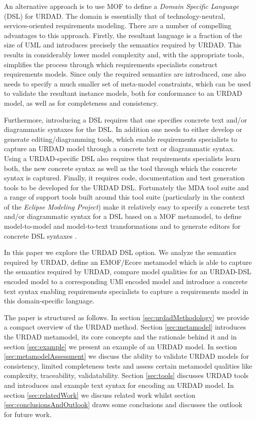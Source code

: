 An alternative approach is to use MOF to define a {\em Domain Specific Language} (DSL) for URDAD. The domain is essentially that of technology-neutral, services-oriented requirements modeling. There are a number of compelling advantages to this approach. Firstly, the resultant language is a fraction of the size of UML and introduces precisely the semantics required by URDAD. This results in considerably lower model complexity and, with the appropriate tools, simplifies the process through which requirements specialists construct requirements models. Since only the required semantics are introduced, one also needs to specify a much smaller set of meta-model constraints, which can be used to validate the resultant instance models, both for conformance to an URDAD model, as well as for completeness and consistency.

Furthermore, introducing a DSL requires that one specifies concrete text and/or diagrammatic syntaxes for the DSL. In addition one needs to either develop or generate editing/diagramming tools, which enable requirements specialists to capture an URDAD model through a concrete text or diagrammatic syntax. Using a URDAD-specific DSL also requires that requirements specialists learn both, the new concrete syntax as well as the tool through which the concrete syntax is captured. Finally, it requires code, documentation and test generation tools to be developed for the URDAD DSL. Fortunately the MDA tool suite and a range of support tools built around this tool suite (particularly in the context of the {\em Eclipse Modeling Project}) make it relatively easy to specify a concrete text and/or diagrammatic syntax for a DSL based on a MOF metamodel, to define model-to-model and model-to-text transformations and to generate editors for concrete DSL syntaxes \cite{gronback_model_2008,}.

In this paper we explore the URDAD DSL option. We analyze the semantics required by URDAD, define an EMOF/Ecore metamodel which is able to capture the semantics required by URDAD, compare model qualities for an URDAD-DSL encoded model to a corresponding UMl encoded model and introduce a concrete text syntax enabling requirements specialists to capture a requirements model in this domain-specific language.

The paper is structured as follows. In section \ref{sec:urdadMethodology} we provide a compact overview of the URDAD method. Section \ref{sec:metamodel} introduces the URDAD metamodel, its core concepts and the rationale behind it and in section \ref{sec:example} we present an example of an URDAD model. In section \ref{sec:metamodelAssessment} we discuss  the ability to validate URDAD models for consistency, limited completeness tests and assess certain metamodel qualities like complexity, traceability, validatability. Section \ref{sec:tools} discusses URDAD tools and introduces and example text syntax for encoding an URDAD model. In section \ref{sec:relatedWork} we discuss related work whilst section \ref{sec:conclusionsAndOutlook} draws some conclusions and discusses the outlook for future work.
